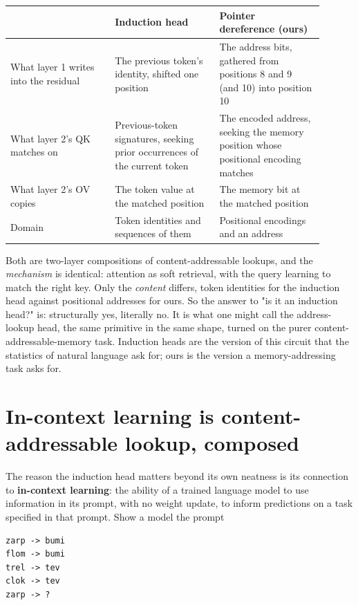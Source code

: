 \begin{center}
\begin{tabular}{@{}p{0.3\linewidth}p{0.3\linewidth}p{0.3\linewidth}@{}}
\toprule
 & Induction head & Pointer dereference (ours) \\
\midrule
What layer 1 writes into the residual & The previous token's identity, shifted one position & The address bits, gathered from positions 8 and 9 (and 10) into position 10 \\[1ex]
What layer 2's QK matches on & Previous-token signatures, seeking prior occurrences of the current token & The encoded address, seeking the memory position whose positional encoding matches \\[1ex]
What layer 2's OV copies & The token value at the matched position & The memory bit at the matched position \\[1ex]
Domain & Token identities and sequences of them & Positional encodings and an address \\
\bottomrule
\end{tabular}
\end{center}

Both are two-layer compositions of content-addressable lookups, and the
\emph{mechanism} is identical: attention as soft retrieval, with the query
learning to match the right key. Only the \emph{content} differs, token
identities for the induction head against positional addresses for ours. So the
answer to "is it an induction head?" is: structurally yes, literally no. It is
what one might call the address-lookup head, the same primitive in the same
shape, turned on the purer content-addressable-memory task. Induction heads are
the version of this circuit that the statistics of natural language ask for;
ours is the version a memory-addressing task asks for.

\section{In-context learning is content-addressable lookup, composed}\label{sec:icl}

The reason the induction head matters beyond its own neatness is its connection
to \textbf{in-context learning}: the ability of a trained language model to use
information in its prompt, with no weight update, to inform predictions on a task
specified in that prompt. Show a model the prompt

\begin{verbatim}
zarp -> bumi
flom -> bumi
trel -> tev
clok -> tev
zarp -> ?
\end{verbatim}

